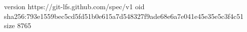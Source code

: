 version https://git-lfs.github.com/spec/v1
oid sha256:793e1559bec5cd5fd51b0e615a7d548327f9ade68e6a7e041e45e35e5c3f4c51
size 8765
